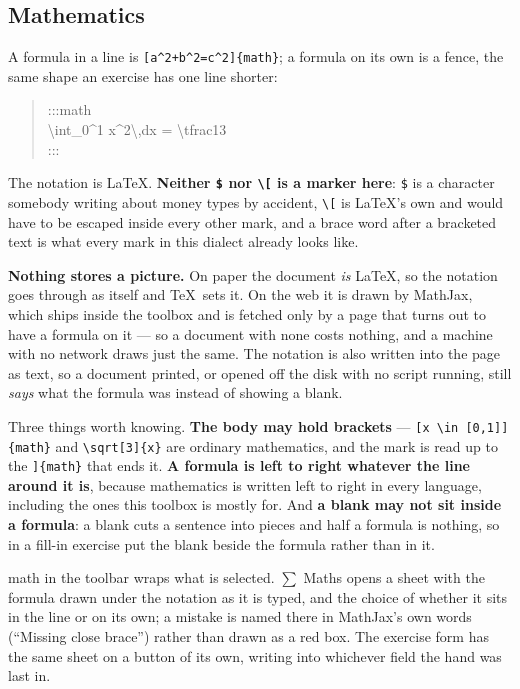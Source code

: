 \documentclass[11pt,oneside]{report}
\newcommand{\menu}[1]{\textsf{#1}}
\begin{document}
\subsection*{Mathematics}
\label{sec:maths}

A formula in a line is \texttt{[a\textasciicircum2+b\textasciicircum2=c\textasciicircum2]\{math\}};
a formula on its own is a fence, the same shape an exercise has one line
shorter:

\begin{quote}\ttfamily
:::math\\
\textbackslash int\_0\textasciicircum1 x\textasciicircum2\textbackslash,dx =
\textbackslash tfrac13\\
:::
\end{quote}

\noindent The notation is \LaTeX. \textbf{Neither \texttt{\$} nor
\texttt{\textbackslash[} is a marker here}: \texttt{\$} is a character
somebody writing about money types by accident, \texttt{\textbackslash[} is
\LaTeX's own and would have to be escaped inside every other mark, and a
brace word after a bracketed text is what every mark in this dialect
already looks like.

\textbf{Nothing stores a picture.} On paper the document \emph{is} \LaTeX,
so the notation goes through as itself and \TeX\ sets it. On the web it is
drawn by MathJax, which ships inside the toolbox and is fetched only by a
page that turns out to have a formula on it --- so a document with none
costs nothing, and a machine with no network draws just the same. The
notation is also written into the page as text, so a document printed, or
opened off the disk with no script running, still \emph{says} what the
formula was instead of showing a blank.

Three things worth knowing. \textbf{The body may hold brackets} ---
\texttt{[x \textbackslash in [0,1]]\{math\}} and
\texttt{\textbackslash sqrt[3]\{x\}} are ordinary mathematics, and the mark
is read up to the \texttt{]\{math\}} that ends it. \textbf{A formula is
left to right whatever the line around it is}, because mathematics is
written left to right in every language, including the ones this toolbox is
mostly for. And \textbf{a blank may not sit inside a formula}: a blank cuts
a sentence into pieces and half a formula is nothing, so in a fill-in
exercise put the blank beside the formula rather than in it.

\menu{math} in the toolbar wraps what is selected. \menu{$\sum$ Maths}
opens a sheet with the formula drawn under the notation as it is typed, and
the choice of whether it sits in the line or on its own; a mistake is named
there in MathJax's own words (``Missing close brace'') rather than drawn as
a red box. The exercise form has the same sheet on a button of its own,
writing into whichever field the hand was last in.
\end{document}
